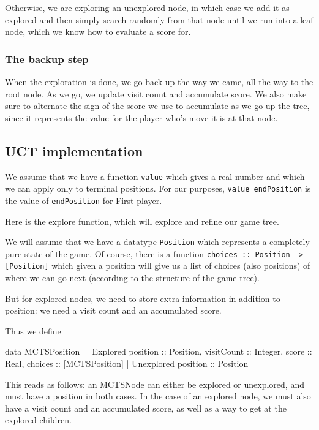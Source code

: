 Otherwise, we are exploring an unexplored node, in which case we add it as explored and then simply search randomly from that node until we run into a leaf node, which we know how to evaluate a score for.

\subsubsection{The backup step}

When the exploration is done, we go back up the way we came, all the way to the root node.
As we go, we update visit count and accumulate score.
We also make sure to alternate the sign of the score we use to accumulate as we go up the tree, since it represents the value for the player who's move it is at that node.


\subsection{UCT implementation}


We assume that we have a function \texttt{value} which gives a real number and which we can apply only to terminal positions.
For our purposes, \texttt{value endPosition} is the value of \texttt{endPosition} for First player.


Here is the explore function, which will explore and refine our game tree.

We will assume that we have a datatype \texttt{Position} which represents a completely pure state of the game.
Of course, there is a function \texttt{choices :: Position -> [Position]} which given a position will give us a list of choices (also positions) of where we can go next (according to the structure of the game tree).

But for explored nodes, we need to store extra information in addition to position: we need a visit count and an accumulated score. 

Thus we define

\begin{code}
  data MCTSPosition =
    Explored {position :: Position, visitCount :: Integer,
              score :: Real, choices :: [MCTSPosition]} |
    Unexplored {position :: Position}
\end{code}

This reads as follows: an MCTSNode can either be explored or unexplored, and must have a position in both cases.
In the case of an explored node, we must also have a visit count and an accumulated score, as well as a way to get at the explored children.


